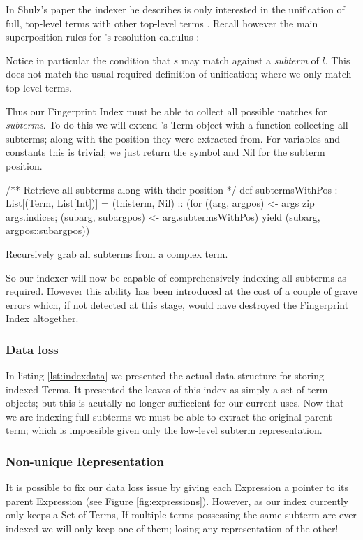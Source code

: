 In Shulz's paper the indexer he describes is only interested in
the unification of full, top-level terms with other top-level terms \cite{shulz12}.
Recall however the main superposition rules for \beagle's resolution calculus \cite{baum13}:

Notice in particular the condition that $s$ may match against a \emph{subterm}
of $l$. This does not match the usual required definition of unification; where
we only match top-level terms.

Thus our Fingerprint Index must be able to collect all possible matches for \emph{subterms}.
To do this we will extend \beagle's Term object with a function collecting all
subterms; along with the position they were extracted from. For variables and constants
this is trivial; we just return the symbol and Nil for the subterm position.

\begin{listing}[H]
\begin{scalacode}
/** Retrieve all subterms along with their position */
def subtermsWithPos : List[(Term, List[Int])] = 
  (thisterm, Nil) :: (for 
    ((arg,    argpos)    <- args zip args.indices;
     (subarg, subargpos) <- arg.subtermsWithPos)
      yield  (subarg, argpos::subargpos))
\end{scalacode}
\caption{Recursively grab all subterms from a complex term.}
\label{lst:subterms}
\end{listing}

So our indexer will now be capable of comprehensively indexing all subterms as required.
However this ability has been introduced at the cost of a couple of grave errors which,
if not detected at this stage, would have destroyed the Fingerprint Index altogether.

\subsubsection{Data loss}
In listing \ref{lst:indexdata} we presented the actual data structure for storing
indexed Terms. It presented the leaves of this index as simply a set of term objects;
but this is acutally no longer suffiecient for our current uses. Now that we are indexing full subterms
we must be able to extract the original parent term; which is impossible given only
the low-level subterm representation.

\subsubsection{Non-unique Representation}
It is possible to fix our data loss issue by giving each Expression a pointer
to its parent Expression (see Figure \ref{fig:expressions}). However, as our index currently only keeps a Set of Terms,
If multiple terms possessing the same subterm are ever indexed we will only keep
one of them; losing any representation of the other!


